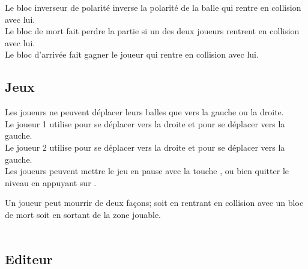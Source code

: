 {{{{\noindent {} Le bloc inverseur de polarité inverse la polarité de la balle qui rentre en collision avec lui. \\

\noindent {} Le bloc de mort fait perdre la partie si un des deux joueurs rentrent en collision avec lui. \\

\noindent {} Le bloc d'arrivée fait gagner le joueur qui rentre en collision avec lui. \\


\subsection {Jeux}

\label {joué}

Les joueurs ne peuvent déplacer leurs balles que vers la gauche ou la droite.\\
Le joueur 1 utilise \Touche{$\rightarrow$} pour se déplacer vers la droite et \Touche{$\leftarrow$} pour se déplacer vers la gauche.\\
Le joueur 2 utilise  pour se déplacer vers la droite et  pour se déplacer vers la gauche.\\

Les joueurs peuvent mettre le jeu en pause avec la touche , ou bien quitter le niveau en appuyant sur .

Un joueur peut mourrir de deux façons; soit en rentrant en collision avec un bloc de mort  soit en sortant de la zone jouable.\\
\\

\subsection {Editeur}

}}}}
